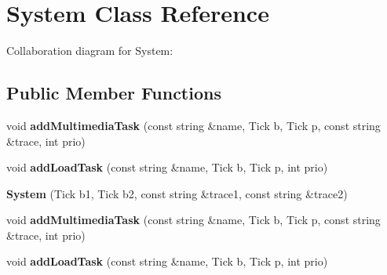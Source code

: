 \hypertarget{classSystem}{}\section{System Class Reference}
\label{classSystem}


Collaboration diagram for System\+:
\subsection*{Public Member Functions}
\begin{DoxyCompactItemize}
\item 
void {\bfseries add\+Multimedia\+Task} (const string \&name, Tick b, Tick p, const string \&trace, int prio)\hypertarget{classSystem_a0f3fed45aad59bd4efc23ef0613faca6}{}\label{classSystem_a0f3fed45aad59bd4efc23ef0613faca6}

\item 
void {\bfseries add\+Load\+Task} (const string \&name, Tick b, Tick p, int prio)\hypertarget{classSystem_ac1e6bc21f3ac498aff466598b169b860}{}\label{classSystem_ac1e6bc21f3ac498aff466598b169b860}

\item 
{\bfseries System} (Tick b1, Tick b2, const string \&trace1, const string \&trace2)\hypertarget{classSystem_a20493c8b0b0a1ee68cae84f4cb3701ed}{}\label{classSystem_a20493c8b0b0a1ee68cae84f4cb3701ed}

\item 
void {\bfseries add\+Multimedia\+Task} (const string \&name, Tick b, Tick p, const string \&trace, int prio)\hypertarget{classSystem_a0f3fed45aad59bd4efc23ef0613faca6}{}\label{classSystem_a0f3fed45aad59bd4efc23ef0613faca6}

\item 
void {\bfseries add\+Load\+Task} (const string \&name, Tick b, Tick p, int prio)\hypertarget{classSystem_ac1e6bc21f3ac498aff466598b169b860}{}\label{classSystem_ac1e6bc21f3ac498aff466598b169b860}

\end{DoxyCompactItemize}
